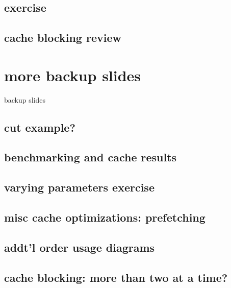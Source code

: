 \subsection{exercise}



\subsection{cache blocking review}


\section{more backup slides}
\begin{frame}{backup slides}
\end{frame}

\subsection{cut example?}


\subsection{benchmarking and cache results}



\subsection{varying parameters exercise}


\subsection{misc cache optimizations: prefetching}



\subsection{addt'l order usage diagrams}

\subsection{cache blocking: more than two at a time?}

%


